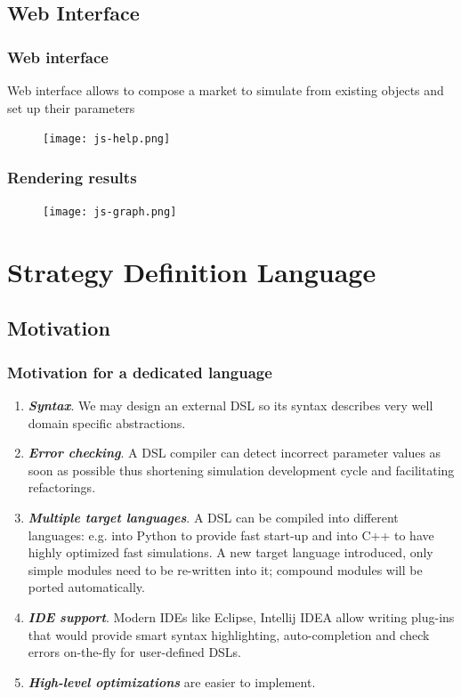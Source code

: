 \documentclass{beamer}
\begin{document}
\subsection{Web Interface}
\begin{frame}
\frametitle{Web interface}
Web interface allows to compose a market to simulate from existing objects and set up their parameters
\begin{figure}[htbp]
\centering
\texttt{[image: js-help.png]}
\end{figure}
\end{frame}

\begin{frame}
\frametitle{Rendering results}
\begin{figure}[htbp]
\centering
\texttt{[image: js-graph.png]}
\end{figure}
\end{frame}

\section{Strategy Definition Language}
\subsection{Motivation}
\begin{frame}
\frametitle{Motivation for a dedicated language}
\begin{enumerate}
  \item \textbf{\textit{Syntax}}. We may design an external DSL so its syntax describes very well domain specific abstractions.
  \item \textbf{\textit{Error checking}}. A DSL compiler can detect incorrect parameter values as soon as possible thus shortening simulation development cycle and facilitating refactorings.
  \item \textbf{\textit{Multiple target languages}}. A DSL can be compiled into different languages: e.g. into Python to provide fast start-up and into C++ to have highly optimized fast simulations. A new target language introduced, only simple modules need to be re-written into it; compound modules will be ported automatically.
  \item \textbf{\textit{IDE support}}. Modern IDEs like Eclipse, Intellij IDEA allow writing plug-ins that would provide smart syntax highlighting, auto-completion and check errors on-the-fly for user-defined DSLs.
  \item \textbf{\textit{High-level optimizations}} are easier to implement.
\end{enumerate}
\end{frame}
\end{document}
